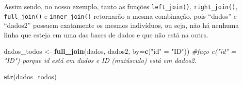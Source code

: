\documentclass[
]{book}
\newenvironment{Shaded}{\begin{snugshade}}{\end{snugshade}}
\newcommand{\CommentTok}[1]{\textcolor[rgb]{0.56,0.35,0.01}{\textit{#1}}}
\newcommand{\DataTypeTok}[1]{\textcolor[rgb]{0.13,0.29,0.53}{#1}}
\newcommand{\KeywordTok}[1]{\textcolor[rgb]{0.13,0.29,0.53}{\textbf{#1}}}
\newcommand{\NormalTok}[1]{#1}
\newcommand{\StringTok}[1]{\textcolor[rgb]{0.31,0.60,0.02}{#1}}
\begin{document}
Assim sendo, no nosso exemplo, tanto as funções \texttt{left\_join()}, \texttt{right\_join()}, \texttt{full\_join()} e \texttt{inner\_join()} retornarão a mesma combinação, pois ``dados'' e ``dados2'' possuem exatamente os mesmos indivíduos, ou seja, não há nenhuma linha que esteja em uma das bases de dados e que não está na outra.

\begin{Shaded}
\begin{Highlighting}[]
\NormalTok{dados_todos <-}\StringTok{ }\KeywordTok{full_join}\NormalTok{(dados, dados2, }\DataTypeTok{by=}\KeywordTok{c}\NormalTok{(}\StringTok{"id"}\NormalTok{ =}\StringTok{ "ID"}\NormalTok{)) }
\CommentTok{#faço c("id" = "ID") porque id está em dados e ID (maiúsculo) está em dados2.}

\KeywordTok{str}\NormalTok{(dados_todos)}
\end{Highlighting}
\end{Shaded}
\end{document}
